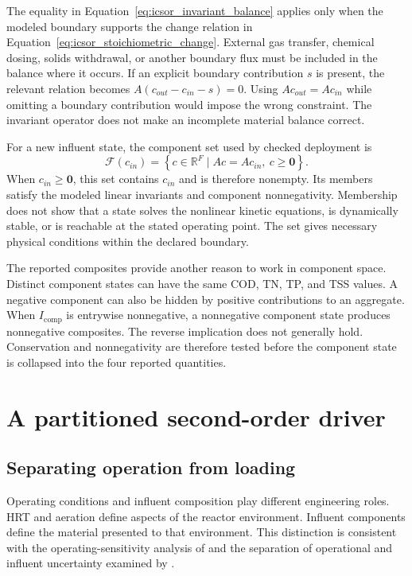 The equality in Equation~\eqref{eq:icsor_invariant_balance} applies only when the modeled boundary supports the change relation in Equation~\eqref{eq:icsor_stoichiometric_change}. External gas transfer, chemical dosing, solids withdrawal, or another boundary flux must be included in the balance where it occurs. If an explicit boundary contribution \(s\) is present, the relevant relation becomes \(A(c_{out}-c_{in}-s)=0\). Using \(Ac_{out}=Ac_{in}\) while omitting a boundary contribution would impose the wrong constraint. The invariant operator does not make an incomplete material balance correct.

For a new influent state, the component set used by checked deployment is
\begin{equation}
\label{eq:icsor_feasible_set}
\mathcal{F}(c_{in})=
\left\{c\in\mathbb{R}^{F}\mid Ac=Ac_{in},\ c\geq\mathbf{0}\right\}.
\end{equation}
When \(c_{in}\geq\mathbf{0}\), this set contains \(c_{in}\) and is therefore nonempty. Its members satisfy the modeled linear invariants and component nonnegativity. Membership does not show that a state solves the nonlinear kinetic equations, is dynamically stable, or is reachable at the stated operating point. The set gives necessary physical conditions within the declared boundary.

The reported composites provide another reason to work in component space. Distinct component states can have the same COD, TN, TP, and TSS values. A negative component can also be hidden by positive contributions to an aggregate. When \(I_{\mathrm{comp}}\) is entrywise nonnegative, a nonnegative component state produces nonnegative composites. The reverse implication does not generally hold. Conservation and nonnegativity are therefore tested before the component state is collapsed into the four reported quantities.

\section{A partitioned second-order driver}

\subsection{Separating operation from loading}

Operating conditions and influent composition play different engineering roles. HRT and aeration define aspects of the reactor environment. Influent components define the material presented to that environment. This distinction is consistent with the operating-sensitivity analysis of \citet{Araujo2013} and the separation of operational and influent uncertainty examined by \citet{Machado2014}.

